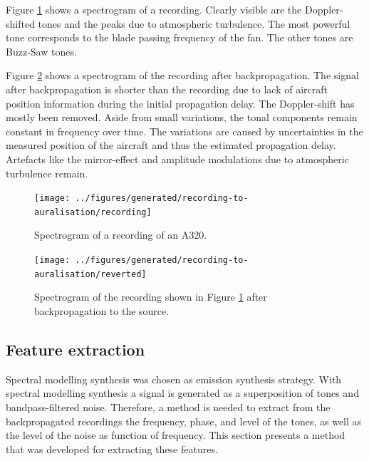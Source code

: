 Figure \ref{fig:recording} shows a spectrogram of a recording. Clearly visible
are the Doppler-shifted tones and the peaks due to atmospheric turbulence. The
most powerful tone corresponds to the blade passing frequency of the fan. The
other tones are Buzz-Saw tones.

Figure \ref{fig:backpropagated} shows a spectrogram of the recording after
backpropagation. The signal after backpropagation is shorter than the recording
due to lack of aircraft position information during the initial propagation
delay. The Doppler-shift has mostly been removed. Aside from small variations,
the tonal components remain constant in frequency over time. The variations are
caused by uncertainties in the measured position of the aircraft and thus the
estimated propagation delay. Artefacts like the mirror-effect and amplitude
modulations due to atmospheric turbulence remain.

\begin{figure}[H]
  \centering
  \texttt{[image: ../figures/generated/recording-to-auralisation/recording]}
  \caption{
    Spectrogram of a recording of an A320. }
  \label{fig:recording}
\end{figure}

\begin{figure}[H]
  \centering
  \texttt{[image: ../figures/generated/recording-to-auralisation/reverted]}
  \caption{Spectrogram of the recording shown in Figure \ref{fig:recording} after backpropagation to the source.}
  \label{fig:backpropagated}
\end{figure}

\subsection{Feature extraction}\label{sec:tool:emission:features}
Spectral modelling synthesis was chosen as emission synthesis strategy. With
spectral modelling synthesis a signal is generated as a superposition of tones
and bandpass-filtered noise.
Therefore, a method is needed to extract from the backpropagated recordings the
frequency, phase, and level of the tones, as well as the level of the noise as
function of frequency. This section presents a method that was developed for
extracting these features.

